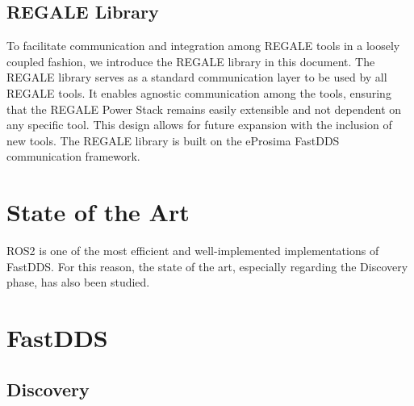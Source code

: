 \subsection{REGALE Library}
To facilitate communication and integration among REGALE tools in a loosely coupled fashion, we introduce the REGALE library in this document. The REGALE library serves as a standard communication layer to be used by all REGALE tools. It enables agnostic communication among the tools, ensuring that the REGALE Power Stack remains easily extensible and not dependent on any specific tool. This design allows for future expansion with the inclusion of new tools. The REGALE library is built on the eProsima FastDDS communication framework.
\newpage
\section{State of the Art}
ROS2 is one of the most efficient and well-implemented implementations of FastDDS. For this reason, the state of the art, especially regarding the Discovery phase, has also been studied.

\section{FastDDS}

\subsection{Discovery}